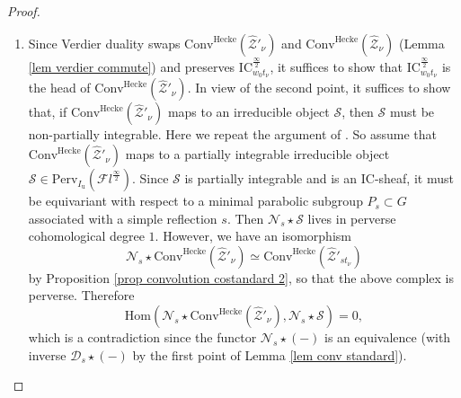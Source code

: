 \documentclass[11pt]{amsart}
\theoremstyle{plain}
\theoremstyle{remark}
\numberwithin{equation}{section}
\begin{document}
\begin{proof}
\begin{enumerate}
			\item Since Verdier duality swaps $\mathrm{Conv}^{\mathrm{Hecke}}(\widehat{\mathcal{Z}}'_{\nu})$ and $\mathrm{Conv}^{\mathrm{Hecke}}(\widehat{\mathcal{Z}}_{\nu})$ (Lemma \ref{lem verdier commute}) and preserves $\mathrm{IC}_{w_0t_\nu}^{\frac{\infty}{2}}$, it suffices to show that $\mathrm{IC}_{w_0t_\nu}^{\frac{\infty}{2}}$ is the head of $\mathrm{Conv}^{\mathrm{Hecke}}(\widehat{\mathcal{Z}}'_{\nu})$. In view of the second point, it suffices to show that, if $\mathrm{Conv}^{\mathrm{Hecke}}(\widehat{\mathcal{Z}}'_{\nu})$ maps to an irreducible object $\mathcal{S}$, then $\mathcal{S}$ must be non-partially integrable. Here we repeat the argument of \cite[Proposition 2.3.2]{ABBGM}. So assume that $\mathrm{Conv}^{\mathrm{Hecke}}(\widehat{\mathcal{Z}}'_{\nu})$ maps to a partially integrable irreducible object $\mathcal{S}\in \mathrm{Perv}_{I_\mathrm{u}}(\mathcal{F}l^{\frac{\infty}{2}})$. Since $\mathcal{S}$ is partially integrable and is an IC-sheaf, it must be equivariant with respect to a minimal parabolic subgroup $P_s\subset G$ associated with a simple reflection $s$. Then $\mathcal{N}_s\star \mathcal{S}$ lives in perverse cohomological degree $1$. However, we have an isomorphism $$\mathcal{N}_s\star\mathrm{Conv}^{\mathrm{Hecke}}(\widehat{\mathcal{Z}}'_{\nu})\simeq \mathrm{Conv}^{\mathrm{Hecke}}(\widehat{\mathcal{Z}}'_{st_\nu})$$ 
   by Proposition \ref{prop convolution costandard 2}, so that the above complex is perverse. Therefore 
   $$\mathrm{Hom}(\mathcal{N}_s\star\mathrm{Conv}^{\mathrm{Hecke}}(\widehat{\mathcal{Z}}'_{\nu}),\mathcal{N}_s\star \mathcal{S})=0,$$ which is a contradiction since the functor $\mathcal{N}_s\star(-)$ is an equivalence (with inverse $\mathcal{D}_s\star(-)$ by the first point of Lemma \ref{lem conv standard}).
		\end{enumerate}\end{proof}
\end{document}
